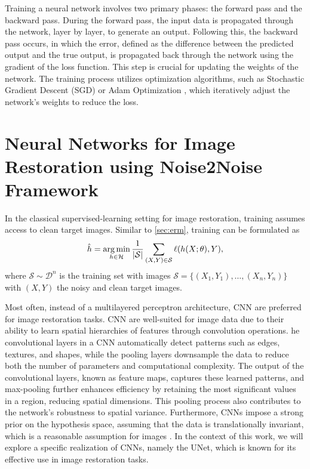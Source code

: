 Training a neural network involves two primary phases: the forward pass and the backward pass. During the forward pass, the input data is propagated through the network, layer by layer, to generate an output. Following this, the backward pass occurs, in which the error, defined as the difference between the predicted output and the true output, is propagated back through the network using the gradient of the loss function. This step is crucial for updating the weights of the network.
The training process utilizes optimization algorithms, such as Stochastic Gradient Descent (SGD) \cite{sutskeverImportanceInitializationMomentum2013} or Adam Optimization \cite{kingmaAdamMethodStochastic2017}, which iteratively adjust the network's weights to reduce the loss.

\section{Neural Networks for Image Restoration using Noise2Noise Framework}
In the classical supervised-learning setting for image restoration, training assumes access to clean target images. Similar to \cref{sec:erm}, training can be formulated as
\begin{equation}
    \hat{h} = \operatorname*{arg\,min}_{h \in \mathcal{H}} \frac{1}{\lvert \mathcal{S} \rvert} \sum_{(X, Y) \in \mathcal{S}} \ell(h(X; \theta), Y),
\end{equation}
where $\mathcal{S} \sim \mathcal{D}^n$ is the training set with images $\mathcal{S} = \{(X_1, Y_1), \dots, (X_n, Y_n)\}$ with $(X, Y)$  the noisy and clean target images.

Most often, instead of a multilayered perceptron architecture, \gls{CNN} are preferred for image restoration tasks. \gls{CNN} are well-suited for image data due to their ability to learn spatial hierarchies of features through convolution operations. he convolutional layers in a \gls{CNN} automatically detect patterns such as edges, textures, and shapes, while the pooling layers downsample the data to reduce both the number of parameters and computational complexity. The output of the convolutional layers, known as feature maps, captures these learned patterns, and max-pooling further enhances efficiency by retaining the most significant values in a region, reducing spatial dimensions. This pooling process also contributes to the network’s robustness to spatial variance. Furthermore, \glspl{CNN} impose a strong prior on the hypothesis space, assuming that the data is translationally invariant, which is a reasonable assumption for images \cite{goodfellowDeepLearning2016}. In the context of this work, we will explore a specific realization of \glspl{CNN}, namely the UNet, which is known for its effective use in image restoration tasks.

